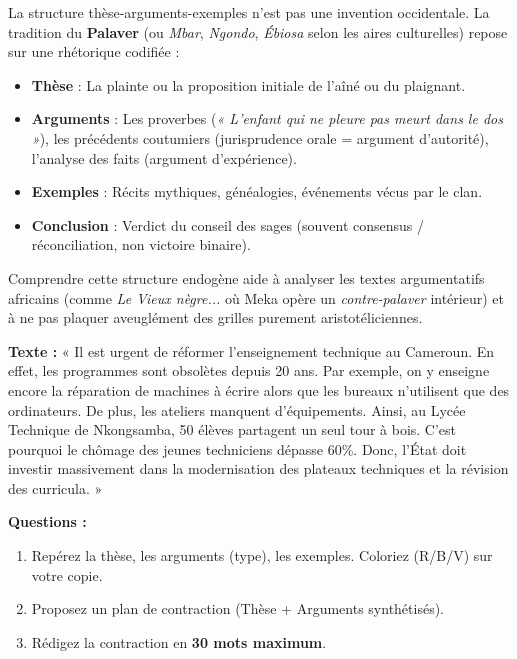 \documentclass[11pt]{article}
\begin{document}
\begin{savaistu}
La structure thèse-arguments-exemples n'est pas une invention occidentale. La tradition du \textbf{Palaver} (ou \textit{Mbar}, \textit{Ngondo}, \textit{Ébiosa} selon les aires culturelles) repose sur une rhétorique codifiée :
\begin{itemize}
    \item \textbf{Thèse} : La plainte ou la proposition initiale de l'aîné ou du plaignant.
    \item \textbf{Arguments} : Les proverbes (\textit{« L'enfant qui ne pleure pas meurt dans le dos »}), les précédents coutumiers (jurisprudence orale = argument d'autorité), l'analyse des faits (argument d'expérience).
    \item \textbf{Exemples} : Récits mythiques, généalogies, événements vécus par le clan.
    \item \textbf{Conclusion} : Verdict du conseil des sages (souvent consensus / réconciliation, non victoire binaire).
\end{itemize}
Comprendre cette structure endogène aide à analyser les textes argumentatifs africains (comme \textit{Le Vieux nègre...} où Meka opère un \textit{contre-palaver} intérieur) et à ne pas plaquer aveuglément des grilles purement aristotéliciennes.
\end{savaistu}

\begin{exercice}
\textbf{Texte :} « Il est urgent de réformer l'enseignement technique au Cameroun. En effet, les programmes sont obsolètes depuis 20 ans. Par exemple, on y enseigne encore la réparation de machines à écrire alors que les bureaux n'utilisent que des ordinateurs. De plus, les ateliers manquent d'équipements. Ainsi, au Lycée Technique de Nkongsamba, 50 élèves partagent un seul tour à bois. C'est pourquoi le chômage des jeunes techniciens dépasse 60\%. Donc, l'État doit investir massivement dans la modernisation des plateaux techniques et la révision des curricula. »

\textbf{Questions :}
\begin{enumerate}
    \item Repérez la thèse, les arguments (type), les exemples. Coloriez (R/B/V) sur votre copie.
    \item Proposez un plan de contraction (Thèse + Arguments synthétisés).
    \item Rédigez la contraction en \textbf{30 mots maximum}.
\end{enumerate}
\end{exercice}
\end{document}
